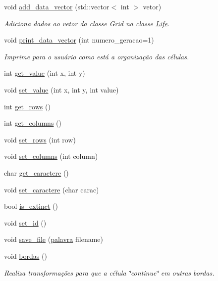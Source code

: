 \begin{DoxyCompactItemize}
void \hyperlink{classLife_a4f2c49e28b51d83ea625b448ac5aa7bb}{add\+\_\+data\+\_\+vector} (std\+::vector$<$ int $>$ vetor)
\begin{DoxyCompactList}\small\item\em Adiciona dados ao vetor da classe Grid na classe \hyperlink{classLife}{Life}. \end{DoxyCompactList}\item 
void \hyperlink{classLife_ae6230a18db54107b46db859424ccd4c3}{print\+\_\+data\+\_\+vector} (int numero\+\_\+geracao=1)
\begin{DoxyCompactList}\small\item\em Imprime para o usuário como está a organização das células. \end{DoxyCompactList}\item 
int \hyperlink{classLife_a84991971ca97509cc769ad527f010585}{get\+\_\+value} (int x, int y)
\item 
void \hyperlink{classLife_a9c560e37d0fdf23e908f5f6e2caf9eab}{set\+\_\+value} (int x, int y, int value)
\item 
int \hyperlink{classLife_ae4a3608385b8435f55102c89363d6e26}{get\+\_\+rows} ()
\item 
int \hyperlink{classLife_ac82f1ba83db36b3142ec12c2fc334de3}{get\+\_\+columns} ()
\item 
void \hyperlink{classLife_a2a76d59604c348b77e49af72a099ba31}{set\+\_\+rows} (int row)
\item 
void \hyperlink{classLife_a62931743c6915fecee04b7a613d724be}{set\+\_\+columns} (int column)
\item 
char \hyperlink{classLife_a21ada75e45a4a244eeab403fb34534fe}{get\+\_\+caractere} ()
\item 
void \hyperlink{classLife_ad24dcdaa235aca6216718cd69e346730}{set\+\_\+caractere} (char carac)
\item 
bool \hyperlink{classLife_a7b7cd244c2ce5b7d6ed0db9a188b2256}{is\+\_\+extinct} ()
\item 
void \hyperlink{classLife_a085768fbd7a228f0e4323208dbe99a0a}{set\+\_\+id} ()
\item 
void \hyperlink{classLife_a11daef20ad2196b79e3f944f701d8438}{save\+\_\+file} (\hyperlink{main_8cpp_a7245fe4f29fbfabfc60878ac7b3ccc0c}{palavra} filename)
\item 
void \hyperlink{classLife_a80aac6b6b00f8cf0589207953f3f844b}{bordas} ()
\begin{DoxyCompactList}\small\item\em Realiza transformações para que a célula \char`\"{}continue\char`\"{} em outras bordas. \end{DoxyCompactList}\end{DoxyCompactItemize}
